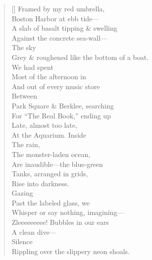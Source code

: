 \label{ch:harbor}
\settowidth{\versewidth}{                                                        The rain,}
\begin{verse}[\versewidth]
Framed by my red umbrella,\\
Boston Harbor at ebb tide---\\
A slab of basalt tipping \& swelling\\
Against the concrete sea-wall---\\
                                                       The sky\\
Grey \& roughened like the bottom of a boat.\\
We had spent\\
Most of the afternoon in\\
And out of every music store\\
                                                       Between\\
Park Square \& Berklee, searching\\
For ``The Real Book,'' ending up\\
Late, almost too late,\\
At the Aquarium.     Inside\\
                                                        The rain,\\
The monster-laden ocean,\\
Are inaudible---the blue-green\\
Tanks, arranged in grids,\\
Rise into darkness.\\
                                                        Gazing\\
Past the labeled glass, we\\
Whisper or say nothing, imagining---\\
 Zleeeeeeeee!   Bubbles in our ears\\
A clean dive---\\
                           Silence\\
Rippling over the slippery neon shoals.
\end{verse}
